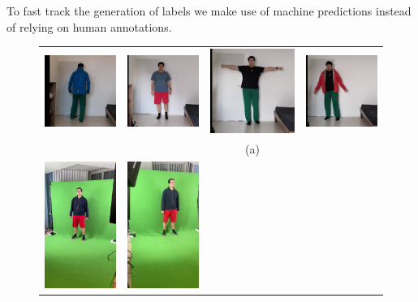 To fast track the generation of labels we make use of machine predictions instead of  relying on human annotations. 
\begin{figure}
  \centering
  \setlength{\tabcolsep}{0.00530\linewidth}
  \begin{tabular}{@{}cccc@{}}
  \includegraphics[width=0.187\linewidth]{figures/dataset_images/Dominik_blue_jacket.jpg}&
  \includegraphics[width=0.187\linewidth]{figures/dataset_images/Dominik_red_pants.jpg}&
  \includegraphics[width=0.187\linewidth]{figures/dataset_images/Dominik_green_pants_black_shirt_01.jpg}&
  \includegraphics[width=0.187\linewidth]{figures/dataset_images/Dominik_green_pants_red_jacket.jpg}\\
  \centering
  & & (a) \\
  \includegraphics[width=0.187\linewidth]{figures/dataset_images/dominik_green_cloth_shorts_phone1.jpg}&
  \includegraphics[width=0.187\linewidth]{figures/dataset_images/dominik_green_cloth_shorts_phone2.jpg}&

\end{tabular}
\end{figure}

